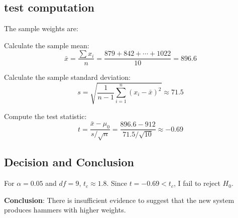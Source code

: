 \subsection*{test computation}
The sample weights are:
\begin{equation}
[879, 842, 954, 842, 885, 918, 989, 768, 867, 1022]
\end{equation}

Calculate the sample mean:
\begin{equation}
\bar{x} = \frac{\sum x_i}{n} = \frac{879 + 842 + \cdots + 1022}{10} = 896.6
\end{equation}

Calculate the sample standard deviation:
\begin{equation}
s = \sqrt{\frac{1}{n-1} \sum_{i=1}^n (x_i - \bar{x})^2} \approx 71.5
\end{equation}

Compute the test statistic:
\begin{equation}
t = \frac{\bar{x} - \mu_0}{s / \sqrt{n}} = \frac{896.6 - 912}{71.5 / \sqrt{10}} \approx -0.69
\end{equation}

\subsection*{Decision and Conclusion}
For $\alpha = 0.05$ and $df = 9$, $t_{c} \approx 1.8$.
Since $t = -0.69 < t_{c}$, I fail to reject $H_{0}$.

\textbf{Conclusion}: There is insufficient evidence to suggest that the new system produces hammers with higher weights.
